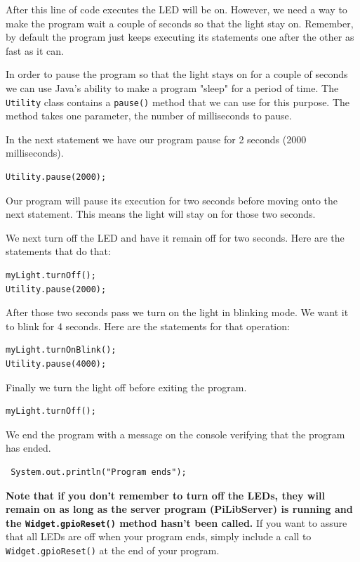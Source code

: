 After this line of code executes the LED will be on. However, we need a way to make the program wait a couple of seconds so that the light stay on. Remember, by default the program just keeps executing its statements one after the other as fast as it can. 

In order to pause the program so that the light stays on for a couple of seconds we can use Java's ability to make a program "sleep" for a period of time. The \texttt{Utility} class contains a \texttt{pause()} method that we can use for this purpose. The method takes one parameter, the number of milliseconds to pause.

In the next statement we have our program pause for 2 seconds (2000 milliseconds).

\beforeverb
\begin{verbatim}
Utility.pause(2000);
\end{verbatim}
\afterverb


Our program will pause its execution for two seconds before moving onto the next statement. This means the light will stay on for those two seconds.

We next turn off the LED and have it remain off for two seconds. Here are the statements that do that:

\beforeverb
\begin{verbatim}
myLight.turnOff();
Utility.pause(2000);
\end{verbatim}
\afterverb

After those two seconds pass we turn on the light in blinking mode. We want it to blink for 4 seconds. Here are the statements for that operation:

\beforeverb
\begin{verbatim}
myLight.turnOnBlink();
Utility.pause(4000);
\end{verbatim}
\afterverb


Finally we turn the light off before exiting the program.

\beforeverb
\begin{verbatim}
myLight.turnOff();
\end{verbatim}
\afterverb

We end the program with a message on the console verifying that the program has ended.

\beforeverb
\begin{verbatim}
 System.out.println("Program ends");
 \end{verbatim}
\afterverb

\textbf{Note that if you don't remember to turn off the LEDs, they will remain on as long as the server program (PiLibServer) is running and the \texttt{Widget.gpioReset()} method hasn't been called.} If you want to assure that all LEDs are off when your program ends, simply include a call to \texttt{Widget.gpioReset()} at the end of your program.
	
